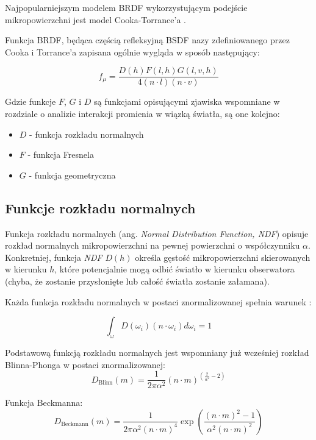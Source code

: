 \documentclass[../main.tex]{subfiles}
\begin{document}
Najpopularniejszym modelem BRDF wykorzystującym podejście mikropowierzchni jest
model Cooka-Torrance'a \cite{CookTorrance}.

Funkcja BRDF, będąca częścią refleksyjną BSDF nazy zdefiniowanego przez Cooka i
Torrance'a zapisana ogólnie wygląda w sposób następujący:

\begin{displaymath}
  f_{\mu} = \frac{
    D(h) F(l,h) G(l,v,h)
  }{
    4 (n \cdot l) (n \cdot v)
  }
\end{displaymath}

Gdzie funkcje $F$, $G$ i $D$ są funkcjami opisującymi zjawiska wspomniane
w rozdziale o analizie interakcji promienia w wiązką światła, są one kolejno:

\begin{itemize}
  \item $D$ - funkcja rozkładu normalnych
  \item $F$ - funkcja Fresnela
  \item $G$ - funkcja geometryczna
\end{itemize}

\subsection{Funkcje rozkładu normalnych}

Funkcja rozkładu normalnych (ang. \textit{Normal Distribution Function, NDF})
opisuje rozkład normalnych mikropowierzchni na pewnej powierzchni o
współczynniku $\alpha$. Konkretniej, funkcja \textit{NDF} $D(h)$ określa
gęstość mikropowierzchni skierowanych w kierunku $h$, które potencjalnie mogą
odbić światło w kierunku obserwatora (chyba, że zostanie przysłonięte lub
całość światła zostanie załamana).

Każda funkcja rozkładu normalnych w postaci znormalizowanej spełnia warunek
\cite{NDFReed}:

\[
  \int_{\omega} {
    D(\omega_i)
    (n \cdot \omega_i)
    d \omega_i
  } = 1
\]

Podstawową funkcją rozkładu normalnych jest wspomniany już wcześniej rozkład
Blinna-Phonga w postaci znormalizowanej:
\[
  D_{\text{Blinn}}(m) =
    \frac{1}{2\pi\alpha^2}
    (n \cdot m)^{(\frac{2}{\alpha^2} - 2)}
\]

Funkcja Beckmanna:
\[
  D_{\text{Beckmann}}(m) =
    \frac{1}{2\pi\alpha^2 (n \cdot m)^{4}}
    \exp\left(
      \frac{
        (n \cdot m)^2 - 1
      }{
        \alpha^2 (n \cdot m)^2
      }
    \right)
\]
\end{document}
